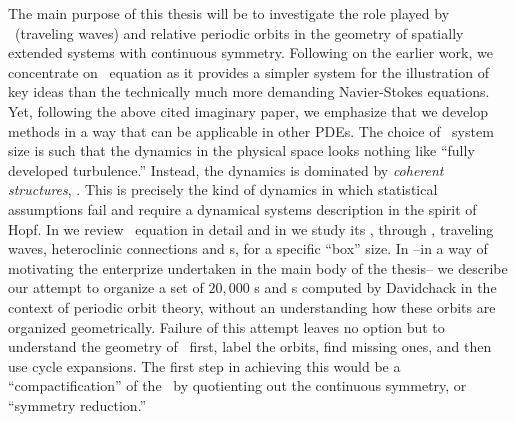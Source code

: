 The main purpose of this thesis will be to investigate the role played by \reqva\ (traveling waves)
and relative periodic orbits in the geometry of spatially extended systems with continuous symmetry. Following
on the earlier work, we concentrate on \KS\ equation as it provides a simpler system for the illustration
of key ideas than the technically much more demanding Navier-Stokes equations. Yet,
following the above cited imaginary paper, we emphasize that we develop methods in
a way that can be applicable in other PDEs.
The choice of \KS\ system size is such that the
dynamics in the physical space looks nothing like ``fully
developed turbulence.'' Instead, the dynamics is dominated by \emph{coherent
structures}, . This is precisely the kind of dynamics in which
statistical assumptions fail and require a
dynamical systems description in the spirit of Hopf. 
In  we review \KS\ equation in detail and in
 we study its \statesp, through \eqva,
traveling waves, heteroclinic connections and \rpo s, for a
specific ``box'' size.
In  --in a way of motivating the enterprize
undertaken in the main body of the thesis-- we describe our
attempt to organize a set of $20,000$ {\po s} and {\rpo s}
computed by Davidchack in the
context of periodic orbit theory, without an understanding how
these orbits are organized geometrically. Failure of this
attempt leaves no option but to understand the geometry of
\statesp\ first, label the orbits, find missing ones, and then
use cycle expansions. The first step in  achieving this would
be a ``compactification'' of the \statesp\ by quotienting out
the continuous symmetry, or ``symmetry reduction.''


